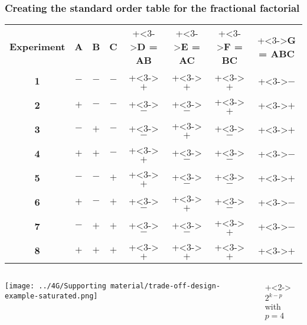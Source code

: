 \begin{frame}\frametitle{Creating the standard order table for the fractional factorial}
	\vspace{0.4cm}
	\begin{tabulary}{\linewidth}{c|ccccccc}
		\textbf{\relax Experiment} & \textbf{\relax A } & \textbf{\relax B} & \textbf{\relax C } & \onslide+<3->{\textbf{\relax D = AB}} & \onslide+<3->{\textbf{\relax E = AC}} & \onslide+<3->{\textbf{\relax F = BC}} & \onslide+<3->{\textbf{\relax G = ABC}} \\ 
		\textbf{1} & \(-\) & \(-\) & \(-\) & \onslide+<3->{\(+\)} & \onslide+<3->{\(+\)} & \onslide+<3->{\(+\)} & \onslide+<3->{\(-\)} \\
		\textbf{2} & \(+\) & \(-\) & \(-\) & \onslide+<3->{\(-\)} & \onslide+<3->{\(-\)} & \onslide+<3->{\(+\)} & \onslide+<3->{\(+\)} \\
		\textbf{3} & \(-\) & \(+\) & \(-\) & \onslide+<3->{\(-\)} & \onslide+<3->{\(+\)} & \onslide+<3->{\(-\)} & \onslide+<3->{\(+\)} \\
		\textbf{4} & \(+\) & \(+\) & \(-\) & \onslide+<3->{\(+\)} & \onslide+<3->{\(-\)} & \onslide+<3->{\(-\)} & \onslide+<3->{\(-\)} \\
		\textbf{5} & \(-\) & \(-\) & \(+\) & \onslide+<3->{\(+\)} & \onslide+<3->{\(-\)} & \onslide+<3->{\(-\)} & \onslide+<3->{\(+\)} \\
		\textbf{6} & \(+\) & \(-\) & \(+\) & \onslide+<3->{\(-\)} & \onslide+<3->{\(+\)} & \onslide+<3->{\(-\)} & \onslide+<3->{\(-\)} \\
		\textbf{7} & \(-\) & \(+\) & \(+\) & \onslide+<3->{\(-\)} & \onslide+<3->{\(-\)} & \onslide+<3->{\(+\)} & \onslide+<3->{\(-\)} \\
		\textbf{8} & \(+\) & \(+\) & \(+\) & \onslide+<3->{\(+\)} & \onslide+<3->{\(+\)} & \onslide+<3->{\(+\)} & \onslide+<3->{\(+\)} \\  
	\end{tabulary}
	
	\vspace{0.4cm}
	
	
	\begin{columns}[T]
		
			\centerline{\texttt{[image: ../4G/Supporting material/trade-off-design-example-saturated.png]}}
		
			\onslide+<2->{
				{\huge $2^{k-p}$\\
				{\normalsize with} $p=4$}
			}
	\end{columns}	
\end{frame}

